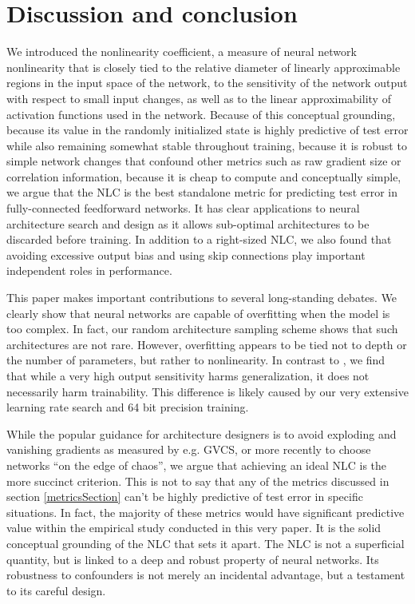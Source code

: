\documentclass{article} %
\begin{document}
\section{Discussion and conclusion}

We introduced the nonlinearity coefficient, a measure of neural network nonlinearity that is closely tied to the relative diameter of linearly approximable regions in the input space of the network, to the sensitivity of the network output with respect to small input changes, as well as to the linear approximability of activation functions used in the network. Because of this conceptual grounding, because its value in the randomly initialized state is highly predictive of test error while also remaining somewhat stable throughout training, because it is robust to simple network changes that confound other metrics such as raw gradient size or correlation information, because it is cheap to compute and conceptually simple, we argue that the NLC is the best standalone metric for predicting test error in fully-connected feedforward networks. It has clear applications to neural architecture search and design as it allows sub-optimal architectures to be discarded before training. In addition to a right-sized NLC, we also found that avoiding excessive output bias and using skip connections play important independent roles in performance.

This paper makes important contributions to several long-standing debates. We clearly show that neural networks are capable of overfitting when the model is too complex. In fact, our random architecture sampling scheme shows that such architectures are not rare. However, overfitting appears to be tied not to depth or the number of parameters, but rather to nonlinearity. In contrast to \citet{depthScalesMeanField,meanFieldCNN}, we find that while a very high output sensitivity harms generalization, it does not necessarily harm trainability. This difference is likely caused by our very extensive learning rate search and 64 bit precision training.

While the popular guidance for architecture designers is to avoid exploding and vanishing gradients as measured by e.g. GVCS, or more recently to choose networks ``on the edge of chaos'', we argue that achieving an ideal NLC is the more succinct criterion. This is not to say that any of the metrics discussed in section \ref{metricsSection} can't be highly predictive of test error in specific situations. In fact, the majority of these metrics would have significant predictive value within the empirical study conducted in this very paper. It is the solid conceptual grounding of the NLC that sets it apart. The NLC is not a superficial quantity, but is linked to a deep and robust property of neural networks. Its robustness to confounders is not merely an incidental advantage, but a testament to its careful design.
\end{document}
